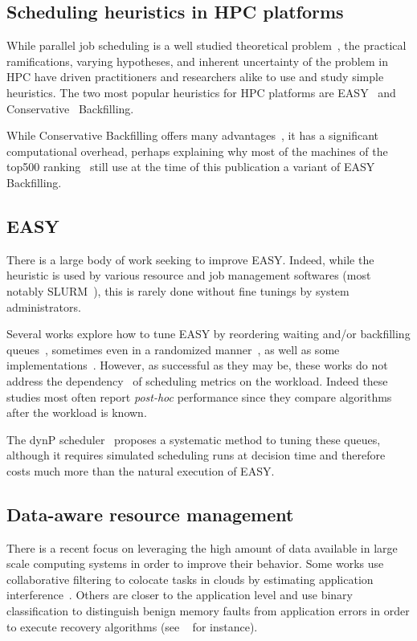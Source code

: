 \documentclass[sigconf]{acmart}
\begin{document}
\subsection{Scheduling heuristics in HPC platforms}

While parallel job scheduling is a well studied theoretical
problem~\cite{leung2004handbook}, the practical ramifications, varying
hypotheses, and inherent uncertainty of the problem in HPC have driven
practitioners and researchers alike to use and study simple heuristics.
The two most popular heuristics for HPC platforms are EASY~\cite{easy} and
Conservative~\cite{Mu'alem:2001:UPW:380314.380315} Backfilling.

While Conservative Backfilling offers many advantages~\cite{bfchar}, it has a
significant computational overhead, perhaps explaining why most of the machines
of the top500 ranking~\cite{top500} still use at the time of this publication a
variant of EASY Backfilling.

\subsection{EASY}
There is a large body of work seeking to improve EASY. Indeed, while the
heuristic is used by various resource and job management softwares (most notably
SLURM~\cite{SLURMdocSCHED}), this is rarely done without fine tunings by system
administrators.

Several works explore how to tune EASY by reordering waiting
and/or backfilling queues~\cite{Tsafrir_easypp_2005}, sometimes even in a
randomized manner~\cite{1592720}, as well as some
implementations~\cite{Jackson2001}. However, as successful as they may be, these works
do not address the dependency~\cite{variability} of scheduling metrics on the
workload. Indeed these studies most often report \textit{post-hoc} performance since
they compare algorithms after the workload is known.

The dynP scheduler~\cite{streit_selftuning_2002} proposes a systematic
method to tuning these queues, although it requires simulated scheduling runs
at decision time and therefore costs much more than the natural execution of EASY.

\subsection{Data-aware resource management}

There is a recent focus on leveraging the high amount of data available in
large scale computing systems in order to improve their behavior. Some works
use collaborative filtering to colocate tasks in clouds by estimating
application interference~\cite{7516031}.  Others are closer to the application
level and use binary classification to distinguish benign memory faults from
application errors in order to execute recovery algorithms (see
~\cite{fmodeling} for instance). 
\end{document}

